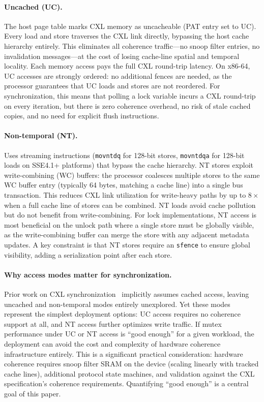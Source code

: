 \paragraph{Uncached (UC).}
The host page table marks CXL memory as uncacheable (PAT entry set to UC).
Every load and store traverses the CXL link directly, bypassing the host cache hierarchy entirely.
This eliminates all coherence traffic---no snoop filter entries, no invalidation messages---at the cost of losing cache-line spatial and temporal locality.
Each memory access pays the full CXL round-trip latency.
On x86-64, UC accesses are strongly ordered: no additional fences are needed, as the processor guarantees that UC loads and stores are not reordered.
For synchronization, this means that polling a lock variable incurs a CXL round-trip on every iteration, but there is zero coherence overhead, no risk of stale cached copies, and no need for explicit flush instructions.

\paragraph{Non-temporal (NT).}
Uses streaming instructions (\texttt{movntdq} for 128-bit stores, \texttt{movntdqa} for 128-bit loads on SSE4.1+ platforms) that bypass the cache hierarchy.
NT stores exploit write-combining (WC) buffers: the processor coalesces multiple stores to the same WC buffer entry (typically 64 bytes, matching a cache line) into a single bus transaction.
This reduces CXL link utilization for write-heavy paths by up to $8\times$ when a full cache line of stores can be combined.
NT loads avoid cache pollution but do not benefit from write-combining.
For lock implementations, NT access is most beneficial on the unlock path where a single store must be globally visible, as the write-combining buffer can merge the store with any adjacent metadata updates.
A key constraint is that NT stores require an \texttt{sfence} to ensure global visibility, adding a serialization point after each store.

\paragraph{Why access modes matter for synchronization.}
Prior work on CXL synchronization~\cite{suetterleinSynchronizationCXLBased2024} implicitly assumes cached access, leaving uncached and non-temporal modes entirely unexplored.
Yet these modes represent the simplest deployment options: UC access requires no coherence support at all, and NT access further optimizes write traffic.
If mutex performance under UC or NT access is ``good enough'' for a given workload, the deployment can avoid the cost and complexity of hardware coherence infrastructure entirely.
This is a significant practical consideration: hardware coherence requires snoop filter SRAM on the device (scaling linearly with tracked cache lines), additional protocol state machines, and validation against the CXL specification's coherence requirements.
Quantifying ``good enough'' is a central goal of this paper.


